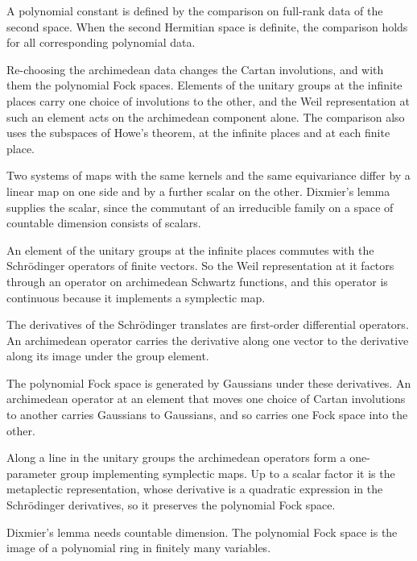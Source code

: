 A polynomial constant is defined by the comparison on full-rank data of the
second space. When the second Hermitian space is definite, the comparison
holds for all corresponding polynomial data.

Re-choosing the archimedean data changes the Cartan involutions, and with them
the polynomial Fock spaces. Elements of the unitary groups at the infinite
places carry one choice of involutions to the other, and the Weil
representation at such an element acts on the archimedean component alone. The
comparison also uses the subspaces of Howe's theorem, at the infinite places
and at each finite place.

Two systems of maps with the same kernels and the same equivariance differ by
a linear map on one side and by a further scalar on the other. Dixmier's lemma
supplies the scalar, since the commutant of an irreducible family on a space of
countable dimension consists of scalars.

An element of the unitary groups at the infinite places commutes with the
Schrödinger operators of finite vectors. So the Weil representation at it
factors through an operator on archimedean Schwartz functions, and this
operator is continuous because it implements a symplectic map.

The derivatives of the Schrödinger translates are first-order differential
operators. An archimedean operator carries the derivative along one vector to
the derivative along its image under the group element.

The polynomial Fock space is generated by Gaussians under these derivatives.
An archimedean operator at an element that moves one choice of Cartan
involutions to another carries Gaussians to Gaussians, and so carries one Fock
space into the other.

Along a line in the unitary groups the archimedean operators form a
one-parameter group implementing symplectic maps. Up to a scalar factor it is
the metaplectic representation, whose derivative is a quadratic expression in
the Schrödinger derivatives, so it preserves the polynomial Fock space.

Dixmier's lemma needs countable dimension. The polynomial Fock space is the
image of a polynomial ring in finitely many variables.

